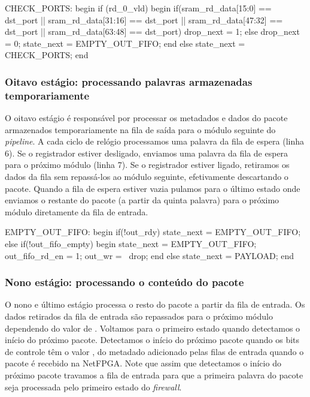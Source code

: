 \begin{verilogcode}
      CHECK_PORTS: begin
         if (rd_0_vld) begin
            if(sram_rd_data[15:0] == dst_port ||
                   sram_rd_data[31:16] == dst_port ||
                   sram_rd_data[47:32] == dst_port ||
                   sram_rd_data[63:48] == dst_port)
               drop_next = 1;
            else
               drop_next = 0;
            state_next = EMPTY_OUT_FIFO;
         end
         else
            state_next = CHECK_PORTS;
      end
\end{verilogcode}

\subsubsection*{Oitavo estágio: processando palavras armazenadas
temporariamente}

O oitavo estágio é responsável por processar os metadados e dados do
pacote armazenados temporariamente na fila de saída para o módulo
seguinte do \emph{pipeline}.  A cada ciclo de relógio processamos
uma palavra da fila de espera (linha 6).  Se o registrador
 estiver desligado, enviamos uma palavra da fila de espera
para o próximo módulo (linha 7).  Se o registrador 
estiver ligado, retiramos os dados da fila sem repassá-los ao módulo
seguinte, efetivamente descartando o pacote.  Quando a fila de
espera estiver vazia pulamos para o último estado onde enviamos o
restante do pacote (a partir da quinta palavra) para o próximo
módulo diretamente da fila de entrada.

\begin{verilogcode}
      EMPTY_OUT_FIFO: begin
         if(!out_rdy)
            state_next = EMPTY_OUT_FIFO;
         else if(!out_fifo_empty) begin
            state_next = EMPTY_OUT_FIFO;
            out_fifo_rd_en = 1;
            out_wr = ~drop;
         end
         else
            state_next = PAYLOAD;
      end
\end{verilogcode}

\subsubsection*{Nono estágio: processando o conteúdo do pacote}

O nono e último estágio processa o resto do pacote a partir da fila
de entrada.  Os dados retirados da fila de entrada são repassados
para o próximo módulo dependendo do valor de .  Voltamos
para o primeiro estado quando detectamos o início do próximo pacote.
Detectamos o início do próximo pacote quando os bits de controle têm
o valor , do metadado adicionado pelas
filas de entrada quando o pacote é recebido na NetFPGA.  Note que
assim que detectamos o início do próximo pacote travamos a fila de
entrada para que a primeira palavra do pacote seja processada pelo
primeiro estado do \emph{firewall}.

